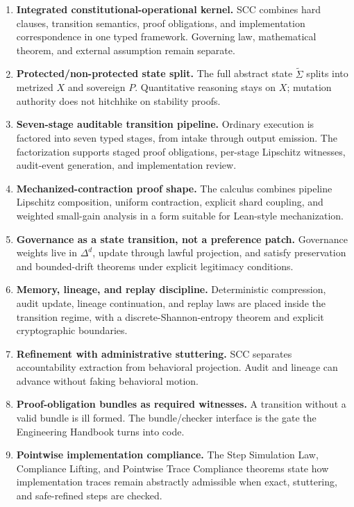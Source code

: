 \documentclass[10pt,oneside]{article}
\theoremstyle{definition}
\theoremstyle{remark}
\begin{document}
\begin{enumerate}
  \item \textbf{Integrated constitutional-operational kernel.} SCC combines hard clauses, transition semantics, proof obligations, and implementation correspondence in one typed framework. Governing law, mathematical theorem, and external assumption remain separate.
  \item \textbf{Protected/non-protected state split.} The full abstract state \(\widetilde{\Sigma}\) splits into metrized \(X\) and sovereign \(P\). Quantitative reasoning stays on \(X\); mutation authority does not hitchhike on stability proofs.
  \item \textbf{Seven-stage auditable transition pipeline.} Ordinary execution is factored into seven typed stages, from intake through output emission. The factorization supports staged proof obligations, per-stage Lipschitz witnesses, audit-event generation, and implementation review.
  \item \textbf{Mechanized-contraction proof shape.} The calculus combines pipeline Lipschitz composition, uniform contraction, explicit shard coupling, and weighted small-gain analysis in a form suitable for Lean-style mechanization.
  \item \textbf{Governance as a state transition, not a preference patch.} Governance weights live in \(\Delta^d\), update through lawful projection, and satisfy preservation and bounded-drift theorems under explicit legitimacy conditions.
  \item \textbf{Memory, lineage, and replay discipline.} Deterministic compression, audit update, lineage continuation, and replay laws are placed inside the transition regime, with a discrete-Shannon-entropy theorem and explicit cryptographic boundaries.
  \item \textbf{Refinement with administrative stuttering.} SCC separates accountability extraction from behavioral projection. Audit and lineage can advance without faking behavioral motion.
  \item \textbf{Proof-obligation bundles as required witnesses.} A transition without a valid bundle is ill formed. The bundle/checker interface is the gate the Engineering Handbook turns into code.
  \item \textbf{Pointwise implementation compliance.} The Step Simulation Law, Compliance Lifting, and Pointwise Trace Compliance theorems state how implementation traces remain abstractly admissible when exact, stuttering, and safe-refined steps are checked.

\end{enumerate}
\end{document}
